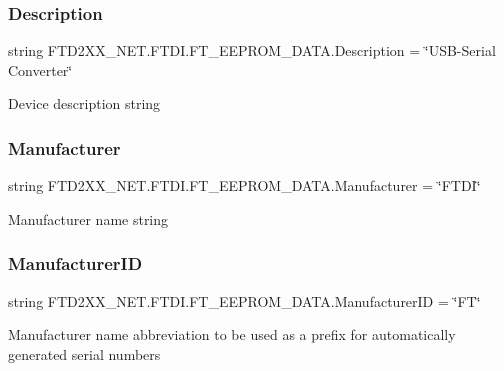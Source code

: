 \subsubsection{\texorpdfstring{Description}{Description}}
{\footnotesize\ttfamily string F\+T\+D2\+X\+X\+\_\+\+N\+E\+T.\+F\+T\+D\+I.\+F\+T\+\_\+\+E\+E\+P\+R\+O\+M\+\_\+\+D\+A\+T\+A.\+Description = \char`\"{}U\+SB-\/Serial Converter\char`\"{}}



Device description string 

\mbox{\label{class_f_t_d2_x_x___n_e_t_1_1_f_t_d_i_1_1_f_t___e_e_p_r_o_m___d_a_t_a_a7e95a958cac94bf9b5bb4c7e2b6a8f0f}} 
\subsubsection{\texorpdfstring{Manufacturer}{Manufacturer}}
{\footnotesize\ttfamily string F\+T\+D2\+X\+X\+\_\+\+N\+E\+T.\+F\+T\+D\+I.\+F\+T\+\_\+\+E\+E\+P\+R\+O\+M\+\_\+\+D\+A\+T\+A.\+Manufacturer = \char`\"{}F\+T\+DI\char`\"{}}



Manufacturer name string 

\mbox{\label{class_f_t_d2_x_x___n_e_t_1_1_f_t_d_i_1_1_f_t___e_e_p_r_o_m___d_a_t_a_a1c4e29b35ff00c13ef63f52780b3a15a}} 
\subsubsection{\texorpdfstring{ManufacturerID}{ManufacturerID}}
{\footnotesize\ttfamily string F\+T\+D2\+X\+X\+\_\+\+N\+E\+T.\+F\+T\+D\+I.\+F\+T\+\_\+\+E\+E\+P\+R\+O\+M\+\_\+\+D\+A\+T\+A.\+Manufacturer\+ID = \char`\"{}FT\char`\"{}}



Manufacturer name abbreviation to be used as a prefix for automatically generated serial numbers 

